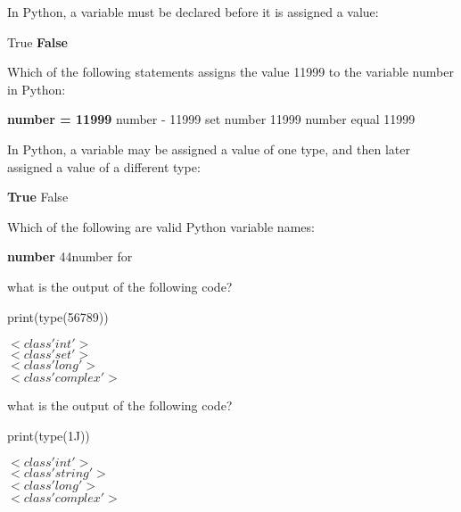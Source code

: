 \documentclass{exam}
\begin{document}
\begin{questions}
    \question In Python, a variable must be declared before it is assigned a value:

    \begin{oneparchoices}
        \choice True
        \choice \textbf{False}
    \end{oneparchoices}

    \question Which of the following statements assigns the value 11999 to the variable number in Python:

    \begin{oneparchoices}
        \choice \textbf{number = 11999}
        \choice number - 11999
        \choice set number 11999
        \choice number equal 11999
    \end{oneparchoices}

    \question In Python, a variable may be assigned a value of one type, and then later assigned a value of a different type:

    \begin{oneparchoices}
        \choice \textbf{True}
        \choice False
    \end{oneparchoices}

    \question Which of the following are valid Python variable names:

    \begin{oneparchoices}
        \choice \textbf{number}
        \choice 44number
        \choice for
    \end{oneparchoices}

    \question what is the output of the following code?

        print(type(56789))

    \begin{oneparchoices}
        \choice \textbf{$< class 'int'>$} \\
        \choice $< class 'set' >$ \\
        \choice $< class 'long' >$ \\
        \choice $< class 'complex' >$
    \end{oneparchoices}

    \question what is the output of the following code?

        print(type(1J))

    \begin{oneparchoices}
        \choice $<class 'int'>$ \\
        \choice $<class 'string'>$ \\
        \choice $<class 'long'>$ \\
        \choice \textbf{$<class 'complex'>$}
    \end{oneparchoices}


\end{questions}
\end{document}
